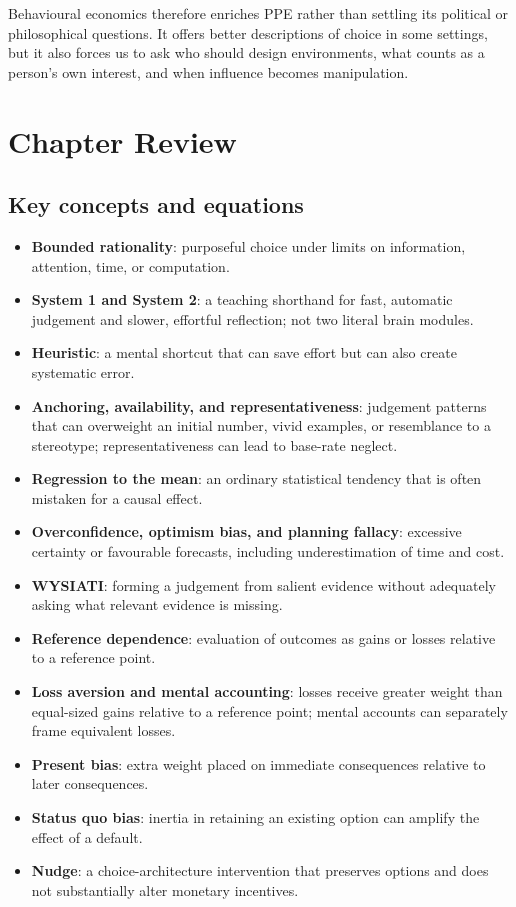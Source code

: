 Behavioural economics therefore enriches PPE rather than settling its political
or philosophical questions. It offers better descriptions of choice in some
settings, but it also forces us to ask who should design environments, what
counts as a person's own interest, and when influence becomes manipulation.

\section*{Chapter Review}

\subsection*{Key concepts and equations}
\begin{itemize}
  \item \textbf{Bounded rationality}: purposeful choice under limits on information, attention, time, or computation.
  \item \textbf{System 1 and System 2}: a teaching shorthand for fast, automatic judgement and slower, effortful reflection; not two literal brain modules.
  \item \textbf{Heuristic}: a mental shortcut that can save effort but can also create systematic error.
  \item \textbf{Anchoring, availability, and representativeness}: judgement patterns that can overweight an initial number, vivid examples, or resemblance to a stereotype; representativeness can lead to base-rate neglect.
  \item \textbf{Regression to the mean}: an ordinary statistical tendency that is often mistaken for a causal effect.
  \item \textbf{Overconfidence, optimism bias, and planning fallacy}: excessive certainty or favourable forecasts, including underestimation of time and cost.
  \item \textbf{WYSIATI}: forming a judgement from salient evidence without adequately asking what relevant evidence is missing.
  \item \textbf{Reference dependence}: evaluation of outcomes as gains or losses relative to a reference point.
  \item \textbf{Loss aversion and mental accounting}: losses receive greater weight than equal-sized gains relative to a reference point; mental accounts can separately frame equivalent losses.
  \item \textbf{Present bias}: extra weight placed on immediate consequences relative to later consequences.
  \item \textbf{Status quo bias}: inertia in retaining an existing option can amplify the effect of a default.
  \item \textbf{Nudge}: a choice-architecture intervention that preserves options and does not substantially alter monetary incentives.
\end{itemize}

